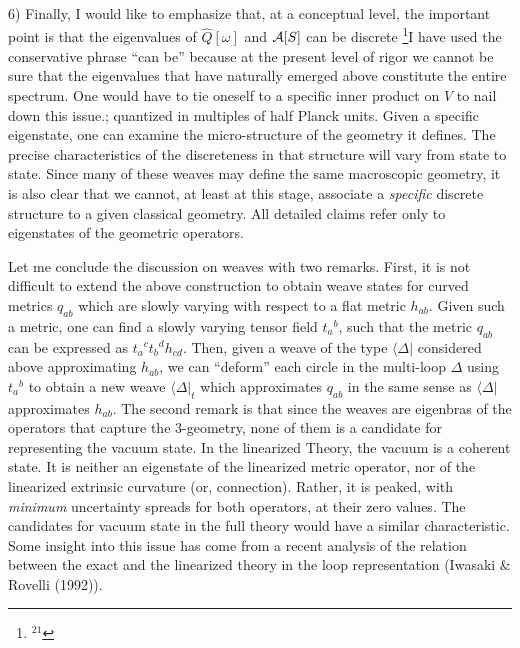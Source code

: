 \item{6)} {Finally, I would like to emphasize that, at a conceptual level,
the important point is that the eigenvalues of $\hat{Q}[\omega ]$ and
${\cal A}[S]$ can be discrete%
\footnote{$^{21}$}{I have used the conservative phrase ``can be'' because
at the present level of rigor we cannot be sure that the eigenvalues that
have naturally emerged above constitute the entire spectrum. One would have
to tie oneself to a specific inner product on $V$ to nail down this issue.};
quantized in multiples of half Planck units. Given a specific eigenstate, one
can examine the micro-structure of the geometry it defines. The precise
characteristics of the discreteness in that structure will vary from state
to state. Since many of these weaves may define the same macroscopic geometry,
it is also clear that we cannot, at least at this stage, associate a {\it
specific} discrete structure to a given classical geometry. All detailed
claims refer only to eigenstates of the geometric operators.}

Let me conclude the discussion on weaves with two remarks. First, it is not
difficult to extend the above construction to obtain weave states for curved
metrics $q_{ab}$ which are slowly varying with respect to a flat metric
$h_{ab}$. Given such a metric, one can find a slowly varying tensor field
$t_a{}^b$, such that the metric $q_{ab}$ can be expressed as $t_a{}^c
t_b{}^d h_{cd}$. Then, given a weave of the type $\langle\Delta|$ considered
above approximating $h_{ab}$, we can ``deform'' each circle in the multi-loop
$\Delta$ using $t_a{}^b$ to obtain a new weave $\langle \Delta |_{t}$ which
approximates $q_{ab}$ in the same sense as $\langle\Delta|$ approximates
$h_{ab}$. The second remark is that since the weaves are eigenbras of the
operators that capture the 3-geometry, none of them is a candidate for
representing the vacuum state. In the linearized Theory, the vacuum is a
coherent state. It is neither an eigenstate of the linearized metric operator,
nor of the linearized extrinsic curvature (or, connection). Rather, it is
peaked, with {\it minimum} uncertainty spreads for both operators, at their
zero values. The candidates for vacuum state in the full theory would have a
similar characteristic. Some insight into this issue has come from a recent
analysis of the relation between the exact and the linearized theory in the
loop representation (Iwasaki \& Rovelli (1992)).

